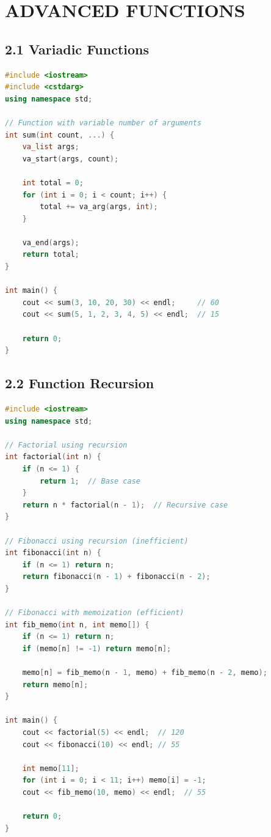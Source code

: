\hypertarget{advanced-functions}{%
\chapter{ADVANCED FUNCTIONS}\label{advanced-functions}}

\hypertarget{variadic-functions}{%
\section{2.1 Variadic Functions}\label{variadic-functions}}

\begin{lstlisting}[language={C++}]
#include <iostream>
#include <cstdarg>
using namespace std;

// Function with variable number of arguments
int sum(int count, ...) {
    va_list args;
    va_start(args, count);
    
    int total = 0;
    for (int i = 0; i < count; i++) {
        total += va_arg(args, int);
    }
    
    va_end(args);
    return total;
}

int main() {
    cout << sum(3, 10, 20, 30) << endl;     // 60
    cout << sum(5, 1, 2, 3, 4, 5) << endl;  // 15
    
    return 0;
}
\end{lstlisting}

\hypertarget{function-recursion}{%
\section{2.2 Function Recursion}\label{function-recursion}}

\begin{lstlisting}[language={C++}]
#include <iostream>
using namespace std;

// Factorial using recursion
int factorial(int n) {
    if (n <= 1) {
        return 1;  // Base case
    }
    return n * factorial(n - 1);  // Recursive case
}

// Fibonacci using recursion (inefficient)
int fibonacci(int n) {
    if (n <= 1) return n;
    return fibonacci(n - 1) + fibonacci(n - 2);
}

// Fibonacci with memoization (efficient)
int fib_memo(int n, int memo[]) {
    if (n <= 1) return n;
    if (memo[n] != -1) return memo[n];
    
    memo[n] = fib_memo(n - 1, memo) + fib_memo(n - 2, memo);
    return memo[n];
}

int main() {
    cout << factorial(5) << endl;  // 120
    cout << fibonacci(10) << endl; // 55
    
    int memo[11];
    for (int i = 0; i < 11; i++) memo[i] = -1;
    cout << fib_memo(10, memo) << endl;  // 55
    
    return 0;
}
\end{lstlisting}

